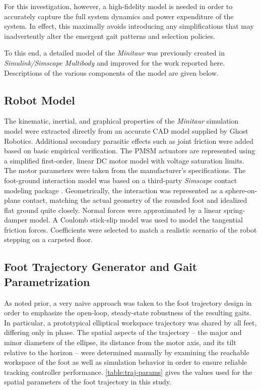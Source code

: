 \documentclass[conference,11pt,letterpaper]{IEEEtran}
\begin{document}
For this investigation, however, a high-fidelity model is needed in order to accurately capture the full system dynamics and power expenditure of the system. In effect, this maximally avoids introducing any simplifications that may inadvertently alter the emergent gait patterns and selection policies.

To this end, a detailed model of the \emph{Minitaur} was previously created in \emph{Simulink/Simscape Multibody} and improved for the work reported here. Descriptions of the various components of the model are given below.

\subsection{Robot Model}
The kinematic, inertial, and graphical properties of the \emph{Minitaur} simulation model were extracted directly from an accurate CAD model supplied by Ghost Robotics. Additional secondary parasitic effects such as joint friction were added based on basic empirical verification. The PMSM actuators are represented using a simplified first-order, linear DC motor model with voltage saturation limits. The motor parameters were taken from the manufacturer's specifications. The foot-ground interaction model was based on a third-party \emph{Simscape} contact modeling package \autocite{contactmodel}. Geometrically, the interaction was represented as a sphere-on-plane contact, matching the actual geometry of the rounded foot and idealized flat ground quite closely. Normal forces were approximated by a linear spring-damper model. A Coulomb stick-slip model was used to model the tangential friction forces. Coefficients were selected to match a realistic scenario of the robot stepping on a carpeted floor.

\subsection{Foot Trajectory Generator and Gait Parametrization}
As noted prior, a very naive approach was taken to the foot trajectory design in order to emphasize the open-loop, steady-state robustness of the resulting gaits. In particular, a prototypical elliptical workspace trajectory was shared by all feet, differing only in phase. The spatial aspects of the trajectory -- the major and minor diameters of the ellipse, its distance from the motor axis, and its tilt relative to the horizon -- were determined manually by examining the reachable workspace of the foot as well as simulation behavior in order to ensure reliable tracking controller performance. \cref{table:traj-params} gives the values used for the spatial parameters of the foot trajectory in this study.
\end{document}
